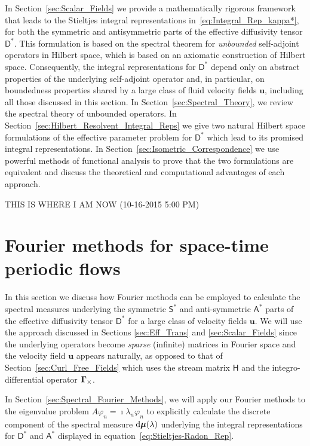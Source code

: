 \documentclass[leqno,onefignum,onetabnum]{siamltex1213}
\newcommand{\secref}[1]{Section~\ref{#1}}
\renewcommand{\d}{\mathrm{d}}
\newcommand{\Dm}{\mathsf{D}}
\newcommand{\Hm}{\mathsf{H}}
\newcommand{\Sm}{\mathsf{S}}
\newcommand{\Am}{\mathsf{A}}
\newcommand\bmu{\mbox{\boldmath${\mu}$}}
\newcommand\bGamma{\mbox{\boldmath${\Gamma}$}}
\newcommand{\vecu}{\boldsymbol{u}}
\begin{document}
In \secref{sec:Scalar_Fields} we provide a mathematically rigorous
framework that leads to the Stieltjes integral representations
in~\eqref{eq:Integral_Rep_kappa*}, for both the symmetric and
antisymmetric parts of the effective diffusivity tensor $\Dm^*$. This
formulation is based on the spectral theorem for 
\emph{unbounded} self-adjoint operators in  Hilbert space, which is
based on an axiomatic construction of Hilbert 
space. Consequently, the integral representations for $\Dm^*$ depend
only on abstract properties of the underlying self-adjoint operator
and, in particular, on boundedness properties shared by a large
class of fluid velocity fields $\vecu$, including all those
discussed in this section. In \secref{sec:Spectral_Theory}, we
review the spectral theory of unbounded operators. In 
\secref{sec:Hilbert_Resolvent_Integral_Reps} we give two natural
Hilbert space formulations of the effective parameter problem for
$\Dm^*$ which lead to its promised integral representations. In
\secref{sec:Isometric_Correspondence} we use powerful methods of
functional analysis to prove that the two formulations are equivalent
and discuss the theoretical and computational advantages of each
approach.  


\newpage


THIS IS WHERE I AM NOW (10-16-2015 5:00 PM)


\section{Fourier methods for space-time periodic
  flows} \label{sec:Fourier_Methods} 
%
In this section we discuss how Fourier methods can be employed to
calculate the spectral measures underlying the symmetric $\Sm^*$ and
anti-symmetric $\Am^*$ parts of the effective diffusivity tensor
$\Dm^*$ for a large class of velocity fields $\vecu$. We will use the
approach discussed in Sections \ref{sec:Eff_Trans} and
\ref{sec:Scalar_Fields} since the underlying operators become
\emph{sparse} (infinite) matrices in Fourier space and the velocity
field $\vecu $ appears naturally, as opposed to that of
\secref{sec:Curl_Free_Fields} which uses the stream matrix $\Hm$ and
the integro-differential operator $\bGamma_\times$.


In
\secref{sec:Spectral_Fourier_Methods}, we will apply our Fourier
methods to the eigenvalue problem $A\varphi_n=\imath\lambda_n\varphi_n$ to explicitly
calculate the discrete component of the spectral 
measure $\d\bmu(\lambda)$ underlying the integral representations for
$\Dm^*$ and $\Am^*$ displayed in
equation~\eqref{eq:Stieltjes-Radon_Rep}.  
\end{document}
